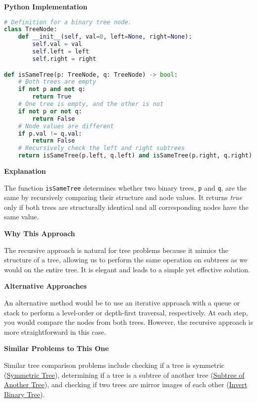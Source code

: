\textbf{Python Implementation}

\begin{lstlisting}[language=Python, xleftmargin=0.02\textwidth, xrightmargin=0.02\textwidth]
# Definition for a binary tree node.
class TreeNode:
    def __init__(self, val=0, left=None, right=None):
        self.val = val
        self.left = left
        self.right = right

def isSameTree(p: TreeNode, q: TreeNode) -> bool:
    # Both trees are empty
    if not p and not q:
        return True
    # One tree is empty, and the other is not
    if not p or not q:
        return False
    # Node values are different
    if p.val != q.val:
        return False
    # Recursively check the left and right subtrees
    return isSameTree(p.left, q.left) and isSameTree(p.right, q.right)
\end{lstlisting}

\textbf{Explanation}

The function \texttt{isSameTree} determines whether two binary trees, \texttt{p} and \texttt{q}, are the same by recursively comparing their structure and node values. It returns \textit{true} only if both trees are structurally identical and all corresponding nodes have the same value.

\textbf{Why This Approach}

The recursive approach is natural for tree problems because it mimics the structure of a tree, allowing us to perform the same operation on subtrees as we would on the entire tree. It is elegant and leads to a simple yet effective solution.

\textbf{Alternative Approaches}

An alternative method would be to use an iterative approach with a queue or stack to perform a level-order or depth-first traversal, respectively. At each step, you would compare the nodes from both trees. However, the recursive approach is more straightforward in this case.

\textbf{Similar Problems to This One}

Similar tree comparison problems include checking if a tree is symmetric (\hyperref[problem:symmetric_tree]{Symmetric Tree}), determining if a tree is a subtree of another tree (\hyperref[problem:subtree_of_another_tree]{Subtree of Another Tree}), and checking if two trees are mirror images of each other (\hyperref[problem:invert_binary_tree]{Invert Binary Tree}).

